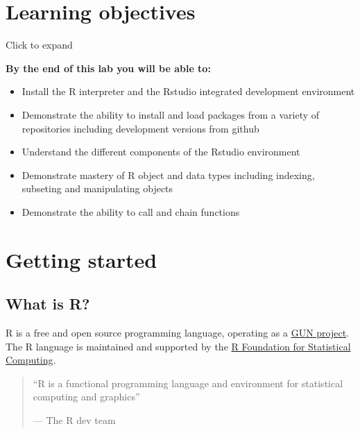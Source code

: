 \documentclass[
]{book}
\theoremstyle{definition}
\theoremstyle{definition}
\theoremstyle{definition}
\theoremstyle{definition}
\theoremstyle{remark}
\begin{document}
\hypertarget{learning-objectives}{%
\section*{\texorpdfstring{\textbf{Learning objectives}}{Learning objectives}}\label{learning-objectives}}

Click to expand

\textbf{By the end of this lab you will be able to:}

\begin{itemize}
\item
  Install the R interpreter and the Rstudio integrated development environment
\item
  Demonstrate the ability to install and load packages from a variety of repositories including development versions from github
\item
  Understand the different components of the Rstudio environment
\item
  Demonstrate mastery of R object and data types including indexing, subseting and manipulating objects
\item
  Demonstrate the ability to call and chain functions
\end{itemize}

\hypertarget{getting-started}{%
\section*{\texorpdfstring{\textbf{Getting started}}{Getting started}}\label{getting-started}}

\hypertarget{what-is-r}{%
\subsection*{\texorpdfstring{\textbf{What is R?}}{What is R?}}\label{what-is-r}}

R is a free and open source programming language, operating as a \href{http://www.gnu.org/}{GUN project}. The R language is maintained and supported by the \href{https://www.r-project.org/foundation/}{R Foundation for Statistical Computing}.

\begin{quote}
``R is a functional programming language and environment for statistical computing and graphics''

--- The R dev team
\end{quote}
\end{document}
